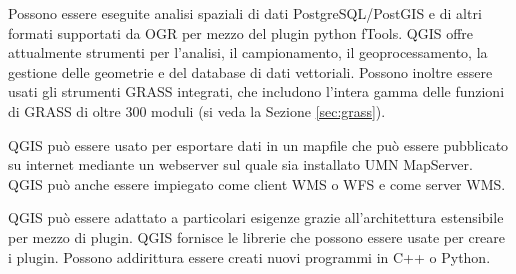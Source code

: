 
Possono essere eseguite analisi spaziali di dati PostgreSQL/PostGIS e di altri
formati supportati da OGR per mezzo del plugin python fTools. QGIS
offre attualmente strumenti per l'analisi, il campionamento, il geoprocessamento,
la gestione delle geometrie e del database di dati vettoriali. Possono
inoltre essere usati gli strumenti GRASS integrati, che includono
l'intera gamma delle funzioni di GRASS di oltre 300 moduli (si veda la Sezione \ref{sec:grass}).


QGIS può essere usato per esportare dati in un mapfile che può essere
pubblicato su internet mediante un webserver sul quale sia installato
UMN MapServer. QGIS può anche essere impiegato come client WMS o
WFS e come server WMS. 


QGIS può essere adattato a particolari esigenze grazie all'architettura
estensibile per mezzo di plugin. QGIS fornisce le librerie che possono
essere usate per creare i plugin. Possono addirittura essere creati
nuovi programmi in C++ o Python.

